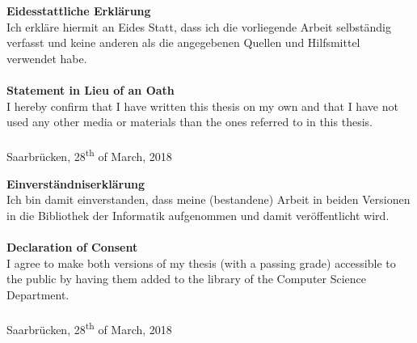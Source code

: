 \textbf{Eidesstattliche Erklärung}
\\

Ich erkläre hiermit an Eides Statt, dass ich die vorliegende Arbeit selbständig verfasst und keine anderen als die angegebenen Quellen und Hilfsmittel verwendet habe.
\\\\

\textbf{Statement in Lieu of an Oath}
\\

I hereby confirm that I have written this thesis on my own and that I have not
used any other media or materials than the ones referred to in this thesis.
\\\\

Saarbrücken, 28\textsuperscript{th} of March, 2018

\vspace{5cm}

\textbf{Einverständniserklärung}
\\

Ich bin damit einverstanden, dass meine (bestandene) Arbeit in beiden Versionen
in die Bibliothek der Informatik aufgenommen und damit veröffentlicht wird.
\\\\

\textbf{Declaration of Consent}
\\

I agree to make both versions of my thesis (with a passing grade) accessible to the
public by having them added to the library of the Computer Science Department.
\\\\

Saarbrücken, 28\textsuperscript{th} of March, 2018